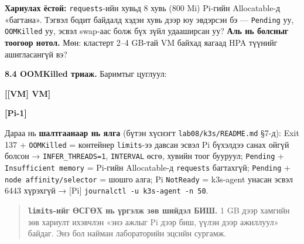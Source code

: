 \textbf{Хариулах ёстой:} \texttt{requests}-ийн хувьд 8 хувь (800 Mi) Pi-гийн Allocatable-д «багтана». Тэгвэл бодит байдалд хэдэн хувь дээр юу эвдэрсэн бэ --- \texttt{Pending} уу, \texttt{OOMKilled} уу, эсвэл swap-аас болж бүх зүйл удааширсан уу? \textbf{Аль нь болсныг тоогоор нотол.} Мөн: кластерт 2--4 GB-тай VM байхад яагаад HPA түүнийг ашигласангүй вэ?

\textbf{8.4 OOMKilled триаж.} Баримтыг цуглуул:

\textbf{{[}{[}VM{]} VM{]}}

\begin{Shaded}
\begin{Highlighting}[]
\OperatorTok{\textless{}}\OperatorTok{\textgreater{}} \KeywordTok{|} 
\end{Highlighting}
\end{Shaded}

\textbf{{[}Pi-1{]}}

\begin{Shaded}
\begin{Highlighting}[]
\KeywordTok{|}  \KeywordTok{|} 
\end{Highlighting}
\end{Shaded}

Дараа нь \textbf{шалтгаанаар нь ялга} (бүтэн хүснэгт \texttt{lab08/\allowbreak{}k3s/\allowbreak{}README.\allowbreak{}md} §7-д): Exit 137 + \texttt{OOMKilled} = контейнер \texttt{limits}-ээ давсан эсвэл Pi бүхэлдээ санах ойгүй болсон → \texttt{INFER\_THREADS=1}, \texttt{INTERVAL} өсгө, хувийн тоог бууруул; \texttt{Pending} + \texttt{Insufficient\ memory} = Pi-гийн Allocatable-д \texttt{requests} багтахгүй; \texttt{Pending} + \texttt{node\ affinity/\allowbreak{}selector} = шошго алга; Pi \texttt{NotReady} = k3s-agent унасан эсвэл 6443 хүрэхгүй → {[}Pi{]} \texttt{journalctl\ -u\ k3s-agent\ -n\ 50}.

\begin{quote}
\textbf{\texttt{limits}-ийг ӨСГӨХ нь үргэлж зөв шийдэл БИШ.} 1 GB дээр хамгийн зөв хариулт ихэвчлэн «энэ ажлыг Pi дээр биш, үүлэн дээр ажиллуул» байдаг. Энэ бол найман лабораторийн эцсийн сургамж.
\end{quote}

